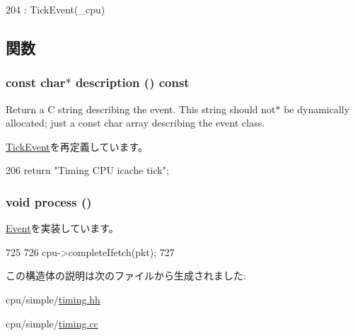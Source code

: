 \begin{DoxyCode}
204                 : TickEvent(_cpu) {}
\end{DoxyCode}


\subsection{関数}
\hypertarget{structTimingSimpleCPU_1_1IcachePort_1_1ITickEvent_a2bd90422eece9190794479e08092a252}{
\subsubsection[{description}]{\setlength{\rightskip}{0pt plus 5cm}const char$\ast$ description () const}}
\label{structTimingSimpleCPU_1_1IcachePort_1_1ITickEvent_a2bd90422eece9190794479e08092a252}
Return a C string describing the event. This string should not$\ast$ be dynamically allocated; just a const char array describing the event class. 

\hyperlink{structTimingSimpleCPU_1_1TimingCPUPort_1_1TickEvent_a2bd90422eece9190794479e08092a252}{TickEvent}を再定義しています。


\begin{DoxyCode}
206 { return "Timing CPU icache tick"; }
\end{DoxyCode}
\hypertarget{structTimingSimpleCPU_1_1IcachePort_1_1ITickEvent_a2e9c5136d19b1a95fc427e0852deab5c}{
\subsubsection[{process}]{\setlength{\rightskip}{0pt plus 5cm}void process ()}}
\label{structTimingSimpleCPU_1_1IcachePort_1_1ITickEvent_a2e9c5136d19b1a95fc427e0852deab5c}


\hyperlink{classEvent_a142b75b68a6291400e20fb0dd905b1c8}{Event}を実装しています。


\begin{DoxyCode}
725 {
726     cpu->completeIfetch(pkt);
727 }
\end{DoxyCode}


この構造体の説明は次のファイルから生成されました:\begin{DoxyCompactItemize}
\item 
cpu/simple/\hyperlink{timing_8hh}{timing.hh}\item 
cpu/simple/\hyperlink{timing_8cc}{timing.cc}\end{DoxyCompactItemize}
